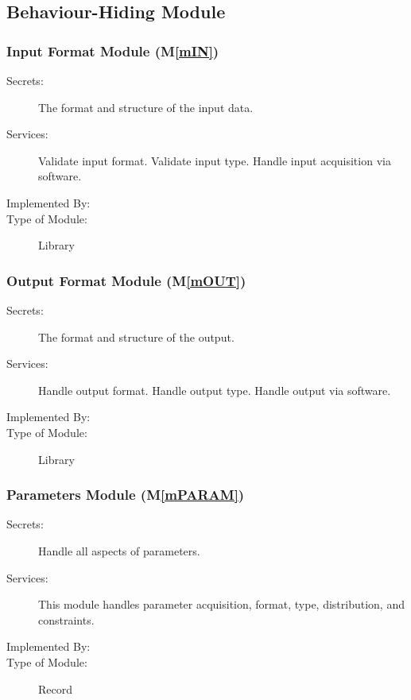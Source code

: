 \documentclass[12pt, titlepage]{article}
\newcommand{\mref}[1]{M\ref{#1}}
\begin{document}
\subsection{Behaviour-Hiding Module}

\subsubsection{Input Format Module (\mref{mIN})}

\begin{description}
\item[Secrets:] The format and structure of the input data.
\item[Services:] Validate input format. Validate input type. Handle input acquisition via software.
\item[Implemented By:] 
\item[Type of Module:] Library
\end{description}

\subsubsection{Output Format Module (\mref{mOUT})}

\begin{description}
\item[Secrets:] The format and structure of the output.
\item[Services:] Handle output format. Handle output type. Handle output via software.
\item[Implemented By:] 
\item[Type of Module:] Library
\end{description}

\subsubsection{Parameters Module (\mref{mPARAM})}

\begin{description}
\item[Secrets:] Handle all aspects of parameters.
\item[Services:] This module handles parameter acquisition, format, type, distribution, and constraints.
\item[Implemented By:] 
\item[Type of Module:] Record
\end{description}
\end{document}
